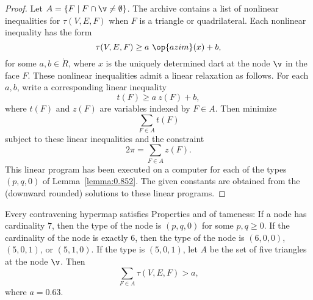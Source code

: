 \begin{proof} Let $A =\{F\mid F\cap \v\ne\emptyset\}$.  The archive
  \cite[FUSDSPJ]{hales:2009:nonlinear} contains a list of nonlinear
  inequalities for $\tau(V,E,F)$ when $F$ is a triangle or
  quadrilateral. Each nonlinear inequality has the form
\begin{displaymath}\tau(V,E,F) \ge a~\op{azim}(x) + b,\end{displaymath}
for some $a,b\in\ring{R}$, where $x$ is the uniquely determined dart
at the node $\v$ in the face $F$.  These nonlinear inequalities admit
a linear relaxation as follows.  For each $a,b$, write a corresponding
linear inequality %
%
\begin{displaymath}
t(F) \ge a~z(F) + b,
\end{displaymath}
where $t(F)$ and $z(F)$ are variables indexed by $F\in A$.
%
%
%
Then  minimize 
\begin{displaymath}\sum_{F\in A} t(F)\end{displaymath}
subject to these linear inequalities and the constraint
\begin{displaymath}
2\pi = \sum_{F\in A} z(F).
\end{displaymath}
This linear program has been executed on a computer for each of the
types $(p,q,0)$ of Lemma~\ref{lemma:0.852}. The given constants are
obtained from the (downward rounded) solutions to these linear
programs.
\end{proof}

\begin{lemma}[]\label{lemma:degE}
  Every contravening hypermap satisfies Properties 
  and 
of tameness: 
If a node has cardinality $7$, then the type of the
node is $(p,q,0)$ for some $p,q\ge0$.   If the
cardinality of the node is exactly $6$, then the type of the node
is $(6,0,0)$, $(5,0,1)$, or $(5,1,0)$.
If the type is $(5,0,1)$, let $A$ be the set of five triangles at the
node $\v$.  Then
%
\begin{displaymath}
\sum_{F\in A} \tau(V,E,F) > a,
\end{displaymath}
where $a=0.63$.
\end{lemma}



